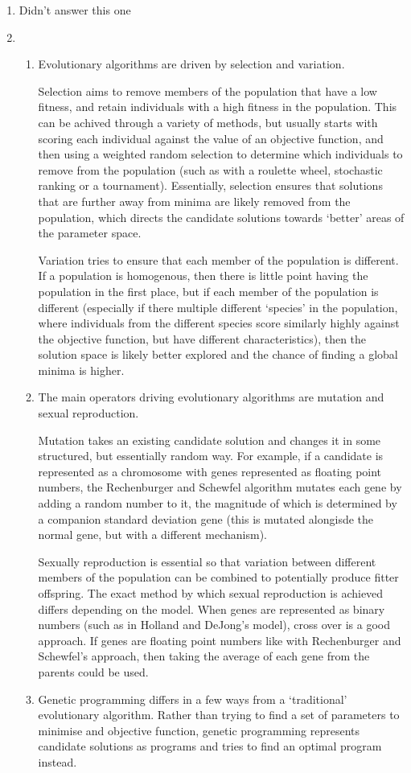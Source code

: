 \documentclass{report}
\begin{document}
\begin{enumerate}
\item Didn't answer this one
\item
  \begin{enumerate}
  \item Evolutionary algorithms are driven by selection and variation.

    Selection aims to remove members of the population that have a low
    fitness, and retain individuals with a high fitness in the
    population. This can be achived through a variety of methods, but
    usually starts with scoring each individual against the value of
    an objective function, and then using a weighted random selection
    to determine which individuals to remove from the population (such
    as with a roulette wheel, stochastic ranking or a
    tournament). Essentially, selection ensures that solutions that
    are further away from minima are likely removed from the
    population, which directs the candidate solutions towards `better'
    areas of the parameter space.

    Variation tries to ensure that each member of the population is
    different. If a population is homogenous, then there is little
    point having the population in the first place, but if each member
    of the population is different (especially if there multiple
    different `species' in the population, where individuals from the
    different species score similarly highly against the objective
    function, but have different characteristics), then the solution
    space is likely better explored and the chance of finding a global
    minima is higher.
  \item The main operators driving evolutionary algorithms are
    mutation and sexual reproduction.

    Mutation takes an existing candidate solution and changes it in
    some structured, but essentially random way. For example, if a
    candidate is represented as a chromosome with genes represented as
    floating point numbers, the Rechenburger and Schewfel algorithm
    mutates each gene by adding a random number to it, the magnitude
    of which is determined by a companion standard deviation gene
    (this is mutated alongisde the normal gene, but with a different
    mechanism).

    Sexually reproduction is essential so that variation between
    different members of the population can be combined to potentially
    produce fitter offspring. The exact method by which sexual
    reproduction is achieved differs depending on the model. When
    genes are represented as binary numbers (such as in Holland and
    DeJong's model), cross over is a good approach. If genes are
    floating point numbers like with Rechenburger and Schewfel's
    approach, then taking the average of each gene from the parents
    could be used.
  \item Genetic programming differs in a few ways from a `traditional'
    evolutionary algorithm. Rather than trying to find a set of
    parameters to minimise and objective function, genetic programming
    represents candidate solutions as programs and tries to find an
    optimal program instead.


\end{enumerate}
\end{enumerate}
\end{document}
